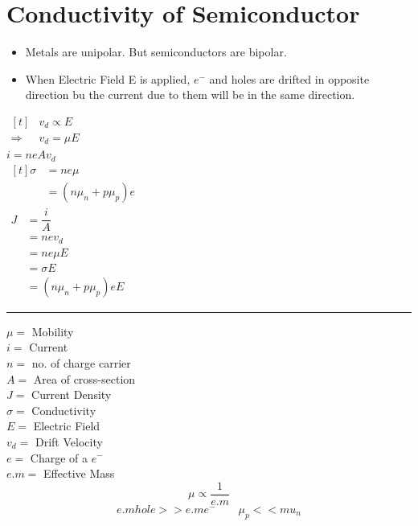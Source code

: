 \documentclass[a4aper,12pt]{report}
\begin{document}
\section{Conductivity of Semiconductor}
\begin{itemize}
    \item Metals are unipolar. But semiconductors are bipolar. 
    \item When Electric Field E is applied, $e^-$ and holes are drifted in opposite direction bu the current due to them will be in the same direction. 
\end{itemize}
\begin{center}\hspace*{1.5cm}
    \begin{minipage}{0.25\linewidth}
        \hspace*{-10pt}$\begin{aligned}[t]
            &v_d \propto E \\
            \Rightarrow\,\, &v_d = \mu E 
        \end{aligned}$ \\ [8pt]
        $i = neAv_d$ \\ [8pt] $\begin{aligned}[t]
            \sigma &= ne\mu \\ 
            &= (n\mu_n+p\mu_p)e
        \end{aligned}$ \\ [8pt]
        $\begin{aligned}
            J &= \dfrac{i}{A} \\ 
            &= nev_d \\
            &= ne\mu E \\ 
            &= \sigma E \\ 
            &= (n\mu_n+p\mu_p)eE 
        \end{aligned}$
    \end{minipage}
    \begin{minipage}{0.05\linewidth}
        \rule{1pt}{7.2cm}
    \end{minipage}
    \begin{minipage}{0.3\linewidth}
        $\mu = $ Mobility \\
        $i = $ Current \\ 
        $n = $ no. of charge carrier \\ 
        $A = $ Area of cross-section \\
        $J = $ Current Density \\ 
        $\sigma = $ Conductivity \\
        $E = $ Electric Field \\ 
        $v_d = $ Drift Velocity \\ 
        $e = $ Charge of a $e^-$ \\ 
        $e.m = $ Effective Mass 
        $$\mu \propto \dfrac{1}{e.m}$$
        $$e.m hole >> e.m e^- \qquad \mu_p << mu_n$$

    \end{minipage}
\end{center}
\end{document}

